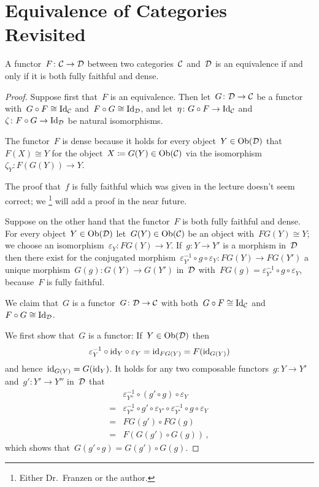 \section{Equivalence of Categories Revisited}


\begin{theorem}
  A functor~$F \colon \mathcal{C} \to \mathcal{D}$ between two categories~$\mathcal{C}$ and~$\mathcal{D}$ is an equivalence if and only if it is both fully faithful and dense.
\end{theorem}


\begin{proof}
  Suppose first that~$F$ is an equivalence.
  Then let~$G \colon \mathcal{D} \to \mathcal{C}$ be a functor with~$G \circ F \cong \mathrm{Id}_{\mathcal{C}}$ and~$F \circ G \cong \mathrm{Id}_{\mathcal{D}}$, and let~$\eta \colon G \circ F \to \mathrm{Id}_{\mathcal{C}}$ and~$\zeta \colon F \circ G \to \mathrm{Id}_{\mathcal{D}}$ be natural isomorphisms.
  
  The functor~$F$ is dense because it holds for every object~$Y \in \operatorname{Ob}(\mathcal{D})$ that~$F(X) \cong Y$ for the object~$X \coloneqq G(Y) \in \operatorname{Ob}(\mathcal{C})$ via the isomorphism~$\zeta_Y \colon F(G(Y)) \to Y$.
  
  The proof that~$f$ is fully faithful which was given in the lecture doesn’t seem correct;
  we%
  \footnote{Either Dr.\ Franzen or the author.}
  will add a proof in the near future.
  
  Suppose on the other hand that the functor~$F$ is both fully faithful and dense.
  For every object~$Y \in \operatorname{Ob}(\mathcal{D})$ let~$G(Y) \in \operatorname{Ob}(\mathcal{C})$ be an object with~$FG(Y) \cong Y$;
  we choose an isomorphism~$\varepsilon_Y \colon FG(Y) \to Y$.
  If~$g \colon Y \to Y'$ is a morphism in~$\mathcal{D}$ then there exist for the conjugated morphism~$\varepsilon_{Y'}^{-1} \circ g \circ \varepsilon_Y \colon FG(Y) \to FG(Y')$ a unique morphism~$G(g) \colon G(Y) \to G(Y')$ in~$\mathcal{D}$ with~$FG(g) = \varepsilon_{Y'}^{-1} \circ g \circ \varepsilon_Y$, because~$F$ is fully faithful.
  
  We claim that~$G$ is a functor~$G \colon \mathcal{D} \to \mathcal{C}$ with both~$G \circ F \cong \mathrm{Id}_{\mathcal{C}}$ and~$F \circ G \cong \mathrm{Id}_{\mathcal{D}}$.
  
  We first show that~$G$ is a functor:
  If~$Y \in \operatorname{Ob}(\mathcal{D})$ then
  \[
      \varepsilon_Y^{-1} \circ \mathrm{id}_Y \circ \varepsilon_Y
    = \mathrm{id}_{FG(Y)}
    = F(\mathrm{id}_{G(Y)})
  \]
  and hence~$\mathrm{id}_{G(Y)} = G(\mathrm{id}_Y)$.
  It holds for any two composable functors~$g \colon Y \to Y'$ and~$g' \colon Y' \to Y''$ in~$\mathcal{D}$ that
  \begin{align*}
     {}&  \varepsilon_{Y''}^{-1} \circ (g' \circ g) \circ \varepsilon_Y \\
    ={}&  \varepsilon_{Y''}^{-1} \circ g' \circ \varepsilon_{Y'}
          \circ
          \varepsilon_{Y'}^{-1} \circ g \circ \varepsilon_Y \\
    ={}&  FG(g') \circ FG(g)  \\
    ={}&  F( G(g') \circ G(g) ) \,,
  \end{align*}
  which shows that~$G(g' \circ g) = G(g') \circ G(g)$.
  

\end{proof}
